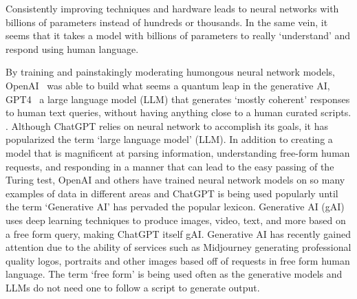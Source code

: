 Consistently improving techniques and hardware leads to neural networks with billions of parameters instead of hundreds or thousands.
In the same vein, it seems that it takes a model with billions of parameters to really `understand' and respond using human language.

By training and painstakingly moderating humongous neural network models, OpenAI~\cite{Bavarian:2022,Weng:2022} was able to build what seems a quantum leap in the generative AI, GPT4~\cite{OpenAI:2023_gpt4} a large language model (LLM) that generates `mostly coherent' responses to human text queries, without having anything close to a human curated scripts. .
Although ChatGPT relies on neural network to accomplish its goals, it has popularized the term `large language model' (LLM).
In addition to creating a model that is magnificent at parsing information, understanding free-form human requests, and responding in a manner that can lead to the easy passing of the Turing test, OpenAI and others have trained neural network models on so many examples of data in different areas and ChatGPT is being used popularly until the term `Generative AI' has pervaded the popular lexicon.
Generative AI (gAI) uses deep learning techniques to produce images, video, text, and more based on a free form query, making ChatGPT itself gAI.
Generative AI has recently gained attention due to the ability of services such as Midjourney  generating professional quality logos, portraits and other images based off of requests in free form human language.
The term `free form' is being used often as the generative models and LLMs do not need one to follow a script to generate output.

\begin{comment}
Thankfully AI is still an extremely hot topic; however, people are referring to everything that seems computationally smart as `artificial intelligence' (AI), mainly to keep things simple.
As stated in the introduction deep learning, mainly based on convolutional neural networks (CNNs), began showing breakthrough performance in image classification tasks, and scientists have been having a field day with the performance gains for multiple tasks, even in genomics [cite so many previous papers from the Diversity application write-up].
\end{comment}